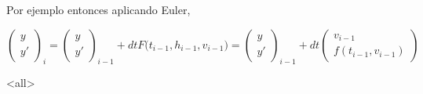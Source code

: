 Por ejemplo entonces aplicando Euler,

\begin{equation}\label{EqnEulerOnHeight}
  \begin{pmatrix}  y \\   y '  \end{pmatrix}_i = 
    \begin{pmatrix}  y \\   y '  \end{pmatrix}_{i-1} +
      dt F \Big( t_{i-1} , h_{i-1}, v_{i-1} \Big)=
      \begin{pmatrix}  y \\   y '  \end{pmatrix}_{i-1} +
	dt \begin{pmatrix} v_{i-1} \\ f(t_{i-1} , v_{i-1} ) \end{pmatrix}
\end{equation}

\mode*

\mode<all>
